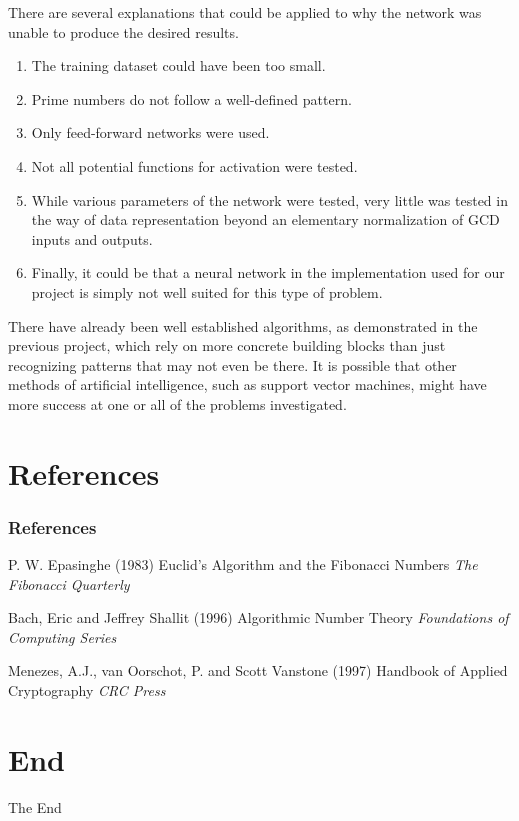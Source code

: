 \documentclass[8pt]{beamer}
\begin{document}
\begin{frame}
There are several explanations that could be applied to why the network was unable to produce the desired results.
\begin{enumerate}
\item The training dataset could have been too small.
\item Prime numbers do not follow a well-defined pattern.
\item Only feed-forward networks were used.
\item Not all potential functions for activation were tested.
\item While various parameters of the network were tested, very little was tested in the way of data representation beyond an elementary normalization of GCD inputs and outputs.
\item Finally, it could be that a neural network in the implementation used for our project is simply not well suited for this type of problem.
\end{enumerate}
\end{frame}

\begin{frame}
There have already been well established algorithms, as demonstrated in the previous project, which rely on more concrete building blocks than just recognizing patterns that may not even be there. It is possible that other methods of artificial intelligence, such as support vector machines, might have more success at one or all of the problems investigated.
\end{frame}




\section{References}
\begin{frame}
\frametitle{References}
\footnotesize{
\begin{thebibliography}{99} %
 P. W. Epasinghe (1983)
\newblock Euclid's Algorithm and the Fibonacci Numbers
\newblock \emph{The Fibonacci Quarterly}

 Bach, Eric and Jeffrey Shallit (1996)
\newblock Algorithmic Number Theory
\newblock \emph{Foundations of Computing Series}

 Menezes, A.J., van Oorschot, P. and Scott Vanstone (1997)
\newblock Handbook of Applied Cryptography
\newblock \emph{CRC Press}
\end{thebibliography}
}
\end{frame}

\section{End}
\begin{frame}
\Huge{\centerline{The End}}
\end{frame}

\end{document}
